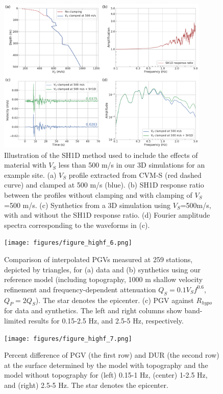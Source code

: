 \begin{figure}[!ht]
  \centering
  \includegraphics[width=0.9\textwidth,height=0.9\textheight,keepaspectratio]{figures/figure_highf_5.pdf}
  \caption{Illustration of the SH1D method used to include the effects of material with $V_S$ less than 500 m/s in our 3D simulations for an example site. (a) $V_S$ profile extracted from CVM-S (red dashed curve) and clamped at 500 m/s (blue). (b) SH1D response ratio between the profiles without clamping and with clamping of $V_S$ =500 m/s. (c) Synthetics from a 3D simulation using $V_S$=500m/s, with and without the SH1D response ratio. (d) Fourier amplitude spectra corresponding to the waveforms in (c).}
  \label{fig:highf-5}
\end{figure}
\clearpage


\begin{figure}[!ht]
  \centering
  \texttt{[image: figures/figure\_highf\_6.png]}
  \caption{Comparison of interpolated PGVs measured at 259 stations, depicted by triangles, for (a) data and (b) synthetics using our reference model (including topography, 1000 m shallow velocity refinement and frequency-dependent attenuation $Q_S=0.1V_Sf^{0.6}$, $Q_P=2Q_S$). The star denotes the epicenter. (c) PGV against $R_{hypo}$ for data and synthetics. The left and right columns show band-limited results for 0.15-2.5 Hz, and 2.5-5 Hz, respectively.
  }
  \label{fig:highf-6}
\end{figure}
\clearpage

\begin{figure}[!ht]
  \centering
  \texttt{[image: figures/figure\_highf\_7.png]}
  \caption{Percent difference of PGV (the first row) and DUR (the second row) at the surface determined by the model with topography and the model without topography for (left) 0.15-1 Hz, (center) 1-2.5 Hz, and (right) 2.5-5 Hz. The star denotes the epicenter.
  }
  \label{fig:highf-7}
\end{figure}
\clearpage

